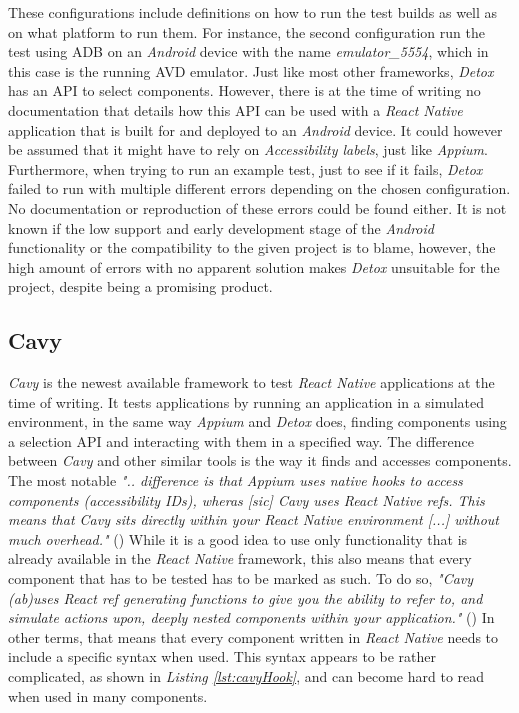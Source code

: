 These configurations include definitions on how to run the test builds as well as on what platform to run them. For instance, the second configuration run the test using ADB on an \textit{Android} device with the name \textit{emulator\_5554}, which in this case is the running AVD emulator.
\newline
Just like most other frameworks, \textit{Detox} has an API to select components. However, there is at the time of writing no documentation that details how this API can be used with a \textit{React Native} application that is built for and deployed to an \textit{Android} device. It could however be assumed that it might have to rely on \textit{Accessibility labels}, just like \textit{Appium}.
\newline
Furthermore, when trying to run an example test, just to see if it fails, \textit{Detox} failed to run with multiple different errors depending on the chosen configuration. No documentation or reproduction of these errors could be found either. It is not known if the low support and early development stage of the \textit{Android} functionality or the compatibility to the given project is to blame, however, the high amount of errors with no apparent solution makes \textit{Detox} unsuitable for the project, despite being a promising product.

\subsection{Cavy}
\label{ssec:cavy}

\textit{Cavy} is the newest available framework to test \textit{React Native} applications at the time of writing. It tests applications by running an application in a simulated environment, in the same way \textit{Appium} and \textit{Detox} does, finding components using a selection API and interacting with them in a specified way.
\newline
The difference between \textit{Cavy} and other similar tools is the way it finds and accesses components. The most notable \textit{".. difference is that Appium uses native hooks to access components (accessibility IDs), wheras [sic] Cavy uses React Native refs. This means that Cavy sits directly within your React Native environment [...] without much overhead."} (\cite{cavy})
\newline
While it is a good idea to use only functionality that is already available in the \textit{React Native} framework, this also means that every component that has to be tested has to be marked as such. To do so, \textit{"Cavy (ab)uses React ref generating functions to give you the ability to refer to, and simulate actions upon, deeply nested components within your application."} (\cite{cavy})
\newline
In other terms, that means that every component written in \textit{React Native} needs to include a specific syntax when used. This syntax appears to be rather complicated, as shown in \textit{Listing \ref{lst:cavyHook}}, and can become hard to read when used in many components.

